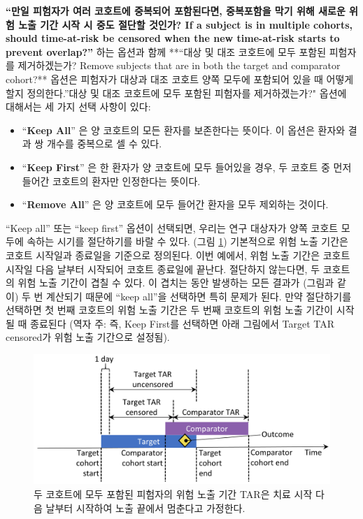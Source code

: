\documentclass[11pt]{book}
\providecommand{\tightlist}{%
  \setlength{\itemsep}{0pt}\setlength{\parskip}{0pt}}
\theoremstyle{definition}
\theoremstyle{definition}
\theoremstyle{definition}
\theoremstyle{remark}
\begin{document}
\textbf{``만일 피험자가 여러 코호트에 중복되어 포함된다면, 중복포함을
막기 위해 새로운 위험 노출 기간 시작 시 중도 절단할 것인가? If a subject
is in multiple cohorts, should time-at-risk be censored when the new
time-at-risk starts to prevent overlap?''} 하는 옵션과 함께 **``대상 및
대조 코호트에 모두 포함된 피험자를 제거하겠는가? Remove subjects that
are in both the target and comparator cohort?** 옵션은 피험자가 대상과
대조 코호트 양쪽 모두에 포함되어 있을 때 어떻게 할지 정의한다.''대상 및
대조 코호트에 모두 포함된 피험자를 제거하겠는가?" 옵션에 대해서는 세
가지 선택 사항이 있다:

\begin{itemize}
\tightlist
\item
  ``\textbf{Keep All}'' 은 양 코호트의 모든 환자를 보존한다는 뜻이다. 이
  옵션은 환자와 결과 쌍 개수를 중복으로 셀 수 있다.
\item
  ``\textbf{Keep First}'' 은 한 환자가 양 코호트에 모두 들어있을 경우,
  두 코호트 중 먼저 들어간 코호트의 환자만 인정한다는 뜻이다.
\item
  ``\textbf{Remove All}'' 은 양 코호트에 모두 들어간 환자을 모두
  제외하는 것이다.
\end{itemize}

``Keep all'' 또는 ``keep first'' 옵션이 선택되면, 우리는 연구 대상자가
양쪽 코호트 모두에 속하는 시기를 절단하기를 바랄 수 있다. (그림
\ref{fig:tar}) 기본적으로 위험 노출 기간은 코호트 시작일과 종료일을
기준으로 정의된다. 이번 예에서, 위험 노출 기간은 코호트 시작일 다음
날부터 시작되어 코호트 종료일에 끝난다. 절단하지 않는다면, 두 코호트의
위험 노출 기간이 겹칠 수 있다. 이 겹치는 동안 발생하는 모든 결과가
(그림과 같이) 두 번 계산되기 때문에 ``keep all''을 선택하면 특히 문제가
된다. 만약 절단하기를 선택하면 첫 번째 코호트의 위험 노출 기간은 두 번째
코호트의 위험 노출 기간이 시작될 때 종료된다 (역자 주: 즉, Keep First를
선택하면 아래 그림에서 Target TAR censored가 위험 노출 기간으로 설정됨).

\begin{figure}

{\centering \includegraphics[width=0.9\linewidth]{images/PopulationLevelEstimation/tar} 

}

\caption{두 코호트에 모두 포함된 피험자의 위험 노출 기간 TAR은 치료 시작 다음 날부터 시작하여 노출 끝에서 멈춘다고 가정한다.}\label{fig:tar}
\end{figure}
\end{document}
